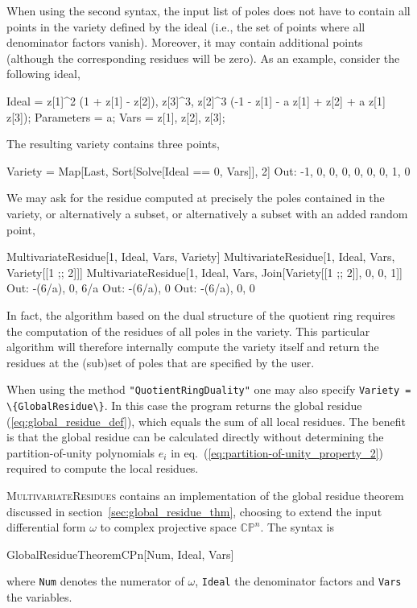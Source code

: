 \documentclass[dvipsnames,preprint,12pt,sort&compress]{elsarticle}
\newcommand{\Math}[1]
{\lstinline[style=Mathematica,breaklines=false,basicstyle=\small \ttfamily\null]~#1~}
\begin{document}
When using the second syntax, the input list of poles does not have to contain all points in the variety defined by the ideal (i.e., the set of points where all denominator factors vanish). Moreover, it may contain additional points (although the corresponding residues will be zero). As an example, consider the following ideal,
\begin{CodeSample}
Ideal = {z[1]^2 (1 + z[1] - z[2]), z[3]^3,
   		z[2]^3 (-1 - z[1] - a z[1] + z[2] + a z[1] z[3])};
Parameters = {a};
Vars = {z[1], z[2], z[3]};
\end{CodeSample}
The resulting variety contains three points,
\begin{CodeSample}
Variety = Map[Last, Sort[Solve[Ideal == 0, Vars]], {2}]
Out: {{-1, 0, 0}, {0, 0, 0}, {0, 1, 0}}
\end{CodeSample}
We may ask for the residue computed at precisely the poles contained in the variety, or alternatively a subset, or alternatively a subset with an added random point,
\begin{CodeSample}
MultivariateResidue[1, Ideal, Vars, Variety]
MultivariateResidue[1, Ideal, Vars, Variety[[1 ;; 2]]]
MultivariateResidue[1, Ideal, Vars, Join[Variety[[1 ;; 2]], {{0, 0, 1}}]]
Out: {-(6/a), 0, 6/a}
Out: {-(6/a), 0}
Out: {-(6/a), 0, 0}
\end{CodeSample}
In fact, the algorithm based on the dual structure of the quotient ring requires the computation of the residues of all poles in the variety. This particular algorithm will therefore internally compute the variety itself and return the residues at the (sub)set of poles that are specified by the user.

When using the method \Math{"QuotientRingDuality"} one may also specify \Math{Variety = \{GlobalResidue\}}. In this case the program returns the global residue (\ref{eq:global_residue_def}), which equals the sum of all local residues. The benefit is that the global residue can be calculated directly without determining the partition-of-unity polynomials $e_i$ in eq.~(\ref{eq:partition-of-unity_property_2}) required to compute the local residues.

\textsc{MultivariateResidues} contains an implementation of
the global residue theorem discussed in section~\ref{sec:global_residue_thm},
choosing to extend the input differential form $\omega$
to complex projective space $\mathbb{CP}^n$.
The syntax is
\begin{CodeSample}
GlobalResidueTheoremCPn[Num, Ideal, Vars]
\end{CodeSample}
where \Math{Num} denotes the numerator of $\omega$,
\Math{Ideal} the denominator factors and \Math{Vars} the variables.
\end{document}
